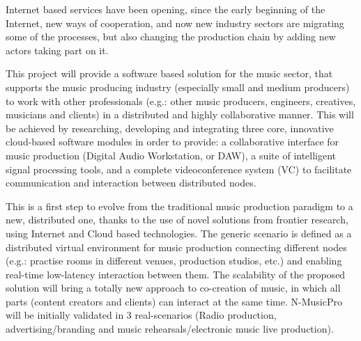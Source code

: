 Internet based services have been opening, since the early beginning of the Internet, new ways of cooperation, and now new industry sectors are migrating some of the processes, but also changing the production chain by adding new actors taking part on it. 

This project will provide a software based solution for the music sector, that supports the music producing industry (especially small and medium producers) to work with other professionals (e.g.: other music producers, engineers, creatives, musicians and clients) in a distributed and highly collaborative manner. This will be achieved by researching, developing and integrating three core, innovative cloud-based software modules in order to provide: a collaborative interface for music production (Digital Audio Workstation, or DAW), a suite of intelligent signal processing tools, and a complete videoconference system (VC) to facilitate communication and interaction between distributed nodes.

This is a first step to evolve from the traditional music production paradigm to a new, distributed one, thanks to the use of novel solutions from frontier research, using Internet and Cloud based technologies. The generic scenario is defined as a distributed virtual environment for music production connecting different nodes (e.g.: practise rooms in different venues, production studios, etc.) and enabling real-time low-latency interaction between them. The scalability of the proposed solution will bring a totally new approach to co-creation of music, in which all parts (content creators and clients) can interact at the same time. N-MusicPro will be initially validated in 3 real-scenarios (Radio production, advertising/branding and music rehearsals/electronic music live production).